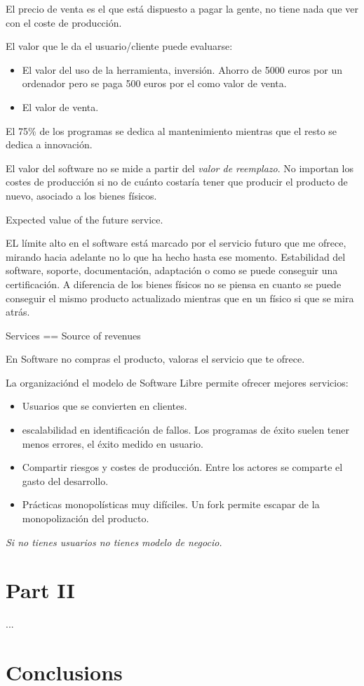 El precio de venta es el que está dispuesto a pagar la gente, no tiene nada que ver con el coste de producción.

El valor que le da el usuario/cliente puede evaluarse:

\begin{itemize}
    \item El valor del uso de la herramienta, inversión. Ahorro de 5000 euros por un ordenador pero se paga 500 euros por el como valor de venta.
    \item El valor de venta.
\end{itemize}

El 75\% de los programas se dedica al mantenimiento mientras que el resto se dedica a innovación.

El valor del software no se mide a partir del \emph{valor de reemplazo}. No importan los costes de producción si no de cuánto costaría tener que producir el producto de nuevo, asociado a los bienes físicos.

Expected value of the future service.

EL límite alto en el software está marcado por el servicio futuro que me ofrece, mirando hacia adelante no lo que ha hecho hasta ese momento. Estabilidad del software, soporte, documentación, adaptación o como se puede conseguir una certificación. A diferencia de los bienes físicos no se piensa en cuanto se puede conseguir el mismo producto actualizado mientras que en un físico si que se mira atrás.

    Services == Source of revenues

En Software no compras el producto, valoras el servicio que te ofrece.

La organizaciónd el modelo de Software Libre permite ofrecer mejores servicios:
\begin{itemize}
    \item Usuarios que se convierten en clientes.
    \item escalabilidad en identificación de fallos. Los programas de éxito suelen tener menos errores, el éxito medido en usuario.
    \item Compartir riesgos y costes de producción. Entre los actores se comparte el gasto del desarrollo.
    \item Prácticas monopolísticas muy difíciles. Un fork permite escapar de la monopolización del producto.
\end{itemize}

\emph{Si no tienes usuarios no tienes modelo de negocio.}

\section{Part II}\label{Part II} %

...

\section{Conclusions}\label{conclusions}
